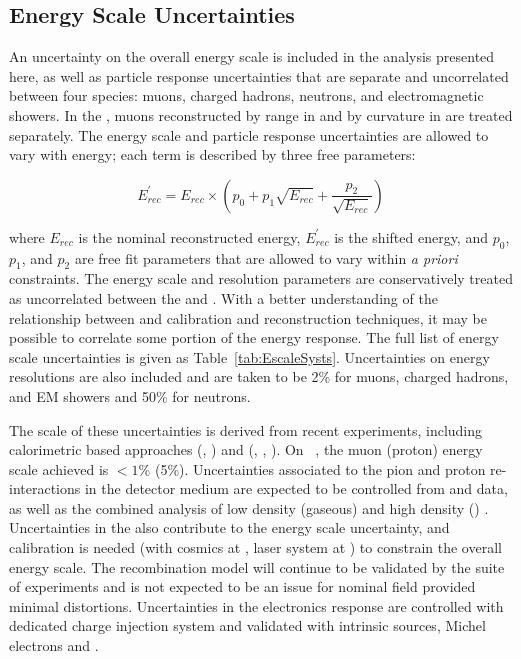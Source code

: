 \subsection{Energy Scale Uncertainties}
\label{sec:EnergyScaleSysts}

An uncertainty on the overall energy scale is included in the analysis presented here, as well as particle response uncertainties that are separate and uncorrelated between four species: muons, charged hadrons, neutrons, and electromagnetic showers. In the , muons reconstructed by range in  and by curvature in  are treated separately. The energy scale and particle response uncertainties are allowed to vary with energy; each term is described by three free parameters:

\begin{equation}
\label{eq:escale_unc}    
E^{\prime}_{rec} = E_{rec} \times (p_{0} + p_{1}\sqrt{E_{rec}} + \frac{p_{2}}{\sqrt{E_{rec}}})
\end{equation}

\noindent
where $E_{rec}$ is the nominal reconstructed energy, $E^{\prime}_{rec}$ is the shifted energy, and $p_{0}$, $p_{1}$, and $p_{2}$ are free fit parameters that are allowed to vary within \textit{a priori} constraints. The energy scale and resolution parameters are conservatively treated as uncorrelated between the  and . With a better understanding of the relationship between  and  calibration and reconstruction techniques, it may be possible to correlate some portion of the energy response. The full list of energy scale uncertainties is given as Table~\ref{tab:EscaleSysts}. Uncertainties on energy resolutions are also included and are taken to be 2\% for muons, charged hadrons, and EM showers and 50\% for neutrons.

The scale of these uncertainties is derived from recent experiments, including calorimetric based approaches (, ) and  (, , ). On ~\cite{NOvA:2018gge}, the muon (proton) energy scale achieved is $<1$\% (5\%). Uncertainties associated to the pion and proton re-interactions in the detector medium are expected to be controlled from  and  data, as well as the combined analysis of low density (gaseous) and high density () . Uncertainties in the \efield also contribute to the energy scale uncertainty, and calibration is needed (with cosmics at , laser system at ) to constrain the overall energy scale. The recombination model will continue to be validated by the suite of  experiments and is not expected to be an issue for nominal field provided minimal \efield distortions. Uncertainties in the electronics response are controlled with dedicated charge injection system and validated with intrinsic sources, Michel electrons and .

